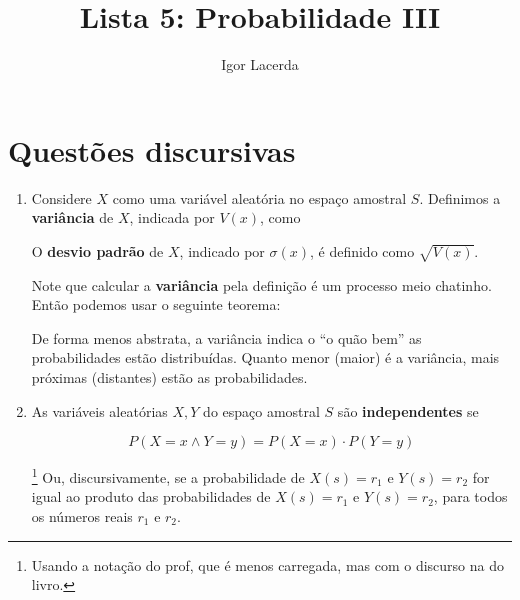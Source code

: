 \documentclass{article}
\title{Lista 5: Probabilidade III}
\author{Igor Lacerda}
\begin{document}
\maketitle

\section*{Questões discursivas}

\begin{enumerate}

    \item Considere \( X \) como uma variável aleatória no espaço amostral \( S \). Definimos a \textbf{variância} de \( X \), indicada por \( V(x) \), como

        \begin{center}
            \fbox{\begin{minipage}{15em}
                    \[ V(x) = \sum_{s \in S} (X(S) - E(X))^{2} \cdot p(s) \] 
            \end{minipage}}
        \end{center}

        O \textbf{desvio padrão} de \( X \), indicado por \( \sigma(x) \), é definido como \( \sqrt{ V(x) } \).

        Note que calcular a \textbf{variância} pela definição é um processo meio chatinho. Então podemos usar o seguinte teorema:

        \begin{center}
        \end{center}

        De forma menos abstrata, a variância indica o ``o quão bem'' as probabilidades estão distribuídas. Quanto menor (maior) é a variância, mais próximas (distantes) estão as probabilidades.

    \item As variáveis aleatórias \( X, Y \) do espaço amostral \( S \) são \textbf{independentes} se 

        \[ P(X = x \land Y = y) = P(X = x) \cdot P(Y = y) \] 

        \footnote{Usando a notação do prof, que é menos carregada, mas com o discurso na do livro.} Ou, discursivamente, se a probabilidade de \( X(s) = r_1 \) e \( Y(s) = r_2  \) for igual ao produto das probabilidades de \( X(s) = r_1 \) e \( Y(s) = r_2 \), para todos os números reais \( r_1 \textrm{ e } r_2 \).


\end{enumerate}
\end{document}
